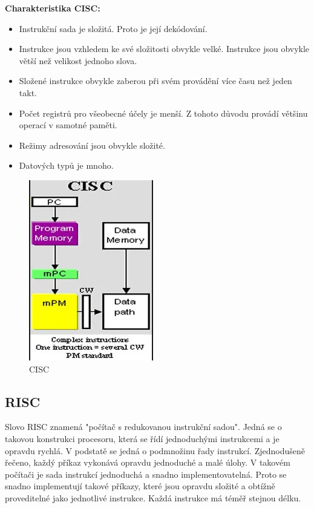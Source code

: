 \textbf{Charakteristika CISC:}\\
\begin{itemize}
\item Instrukční sada je složitá. Proto je její dekódování.
\item Instrukce jsou vzhledem ke své složitosti obvykle velké. Instrukce jsou obvykle větší než velikost jednoho slova.
\item Složené instrukce obvykle zaberou při svém provádění více času než jeden takt.
\item Počet registrů pro všeobecné účely je menší. Z tohoto důvodu provádí většinu operací v samotné paměti.
\item Režimy adresování jsou obvykle složité.
\item Datových typů je mnoho.
\end{itemize}

    \begin{figure}[h]
   \begin{center}
     \includegraphics[scale=0.5]{images/CISC.png}
   \end{center}
   \caption{CISC}
  \end{figure}

\subsection{RISC}
Slovo RISC znamená "počítač s redukovanou instrukční sadou". Jedná se o takovou konstrukci procesoru, která se řídí jednoduchými instrukcemi a je opravdu rychlá. V podstatě se jedná o podmnožinu řady instrukcí. Zjednodušeně řečeno, každý příkaz vykonává opravdu jednoduché a malé úlohy. V takovém počítači je sada instrukcí jednoduchá a snadno implementovatelná. Proto se snadno implementují takové příkazy, které jsou opravdu složité a obtížně proveditelné jako jednotlivé instrukce. Každá instrukce má téměř stejnou délku. 


